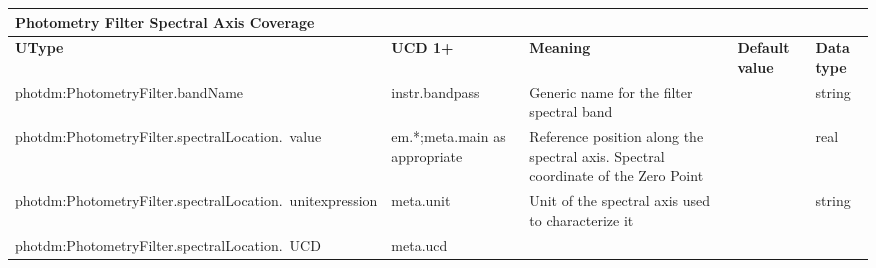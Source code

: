 \documentclass[11pt,a4paper]{ivoa}
\begin{document}
\begin{appendices}
\begin{table}[H]
\centering
\begin{adjustbox}{angle=90}
\begin{tabular}{p{2.5in}|p{1.5in}|p{2in}|p{0.74in}|p{0.35in}}
\multicolumn{5}{p{\dimexpr6.59in+8\tabcolsep\relax}}{\centering
{\fontsize{8pt}{8pt}\selectfont \textbf{Photometry Filter Spectral Axis Coverage}}} \\
\hline
\multicolumn{1}{p{2.5in}}{{\fontsize{8pt}{8pt}\selectfont \textbf{UType}}} &
\multicolumn{1}{p{1.5in}}{{\fontsize{8pt}{8pt}\selectfont \textbf{UCD 1+}}} &
\multicolumn{1}{p{2in}}{{\fontsize{8pt}{8pt}\selectfont \textbf{Meaning}}} &
\multicolumn{1}{p{0.74in}}{{\fontsize{8pt}{8pt}\selectfont \textbf{Default value}}} &
\multicolumn{1}{p{0.35in}}{{\fontsize{8pt}{8pt}\selectfont \textbf{Data type}}} \\
\hline
\multicolumn{1}{p{2.5in}}{{\fontsize{8pt}{8pt}\selectfont photdm:PhotometryFilter.bandName}} &
\multicolumn{1}{p{1.5in}}{{\fontsize{8pt}{8pt}\selectfont instr.bandpass }} &
\multicolumn{1}{p{2in}}{{\fontsize{8pt}{8pt}\selectfont Generic name for the
filter spectral band}} &
\multicolumn{1}{p{0.74in}}{} &
\multicolumn{1}{p{0.35in}}{{\fontsize{8pt}{8pt}\selectfont string}} \\
\hline
\multicolumn{1}{p{2.5in}}{{\fontsize{8pt}{8pt}
\selectfont photdm:PhotometryFilter.spectralLocation.\ value}} &
\multicolumn{1}{p{1.5in}}{{\fontsize{8pt}{8pt}\selectfont em.*;meta.main as appropriate}} &
\multicolumn{1}{p{2in}}{{\fontsize{8pt}{8pt}\selectfont Reference position along the
spectral axis. Spectral coordinate of the Zero Point }} &
\multicolumn{1}{p{0.74in}}{} &
\multicolumn{1}{p{0.35in}}{{\fontsize{8pt}{8pt}\selectfont real}} \\
\hline
\multicolumn{1}{p{2.5in}}{{\fontsize{8pt}{8pt}
\selectfont photdm:PhotometryFilter.spectralLocation.\ unitexpression}} &
\multicolumn{1}{p{1.5in}}{{\fontsize{8pt}{8pt}\selectfont meta.unit }} &
\multicolumn{1}{p{2in}}{{\fontsize{8pt}{8pt}\selectfont Unit of the spectral axis used
to characterize it}} &
\multicolumn{1}{p{0.74in}}{{\fontsize{8pt}{8pt}\selectfont }} &
\multicolumn{1}{p{0.35in}}{{\fontsize{8pt}{8pt}\selectfont string}} \\
\hline
\multicolumn{1}{p{2.5in}}{{\fontsize{8pt}{8pt}
\selectfont photdm:PhotometryFilter.spectralLocation.\ UCD}} &
\multicolumn{1}{p{1.5in}}{{\fontsize{8pt}{8pt}\selectfont meta.ucd }} &

\end{tabular}
\end{adjustbox}
\end{table}
\end{appendices}
\end{document}
